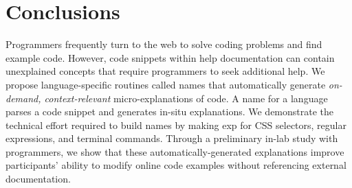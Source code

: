 \section{Conclusions}

Programmers frequently turn to the web to solve coding problems and find example code.
However, code snippets within  help documentation can contain unexplained concepts that require programmers to seek additional help.
We propose language-specific routines called \Glspl{name} that automatically generate \emph{on-demand, context-relevant} micro-explanations of code.
A \gls{name} for a language parses a code snippet and generates in-situ  explanations.
We demonstrate the technical effort required to build \glspl{name} by making \gls{exp} for CSS selectors, regular expressions, and terminal commands.
Through a preliminary in-lab study with   programmers, we show that these automatically-generated explanations improve participants' ability to modify online code examples without referencing external documentation.
